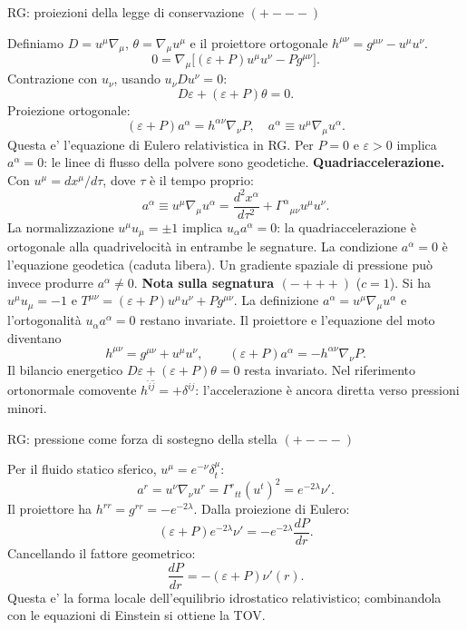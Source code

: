 \begin{frame}[t]{RG: proiezioni della legge di conservazione $(+---)$}\small\raggedright

Definiamo $D=u^\mu\nabla_\mu$, $\theta=\nabla_\mu u^\mu$ e il proiettore ortogonale $h^{\mu\nu}=g^{\mu\nu}-u^\mu u^\nu$.
\[
0=\nabla_\mu\big[(\varepsilon+P)u^\mu u^\nu-Pg^{\mu\nu}\big].
\]
Contrazione con $u_\nu$, usando $u_\nu D u^\nu=0$:
\[
\boxed{D\varepsilon+(\varepsilon+P)\theta=0.}
\]
Proiezione ortogonale:
\[
\boxed{(\varepsilon+P)a^\alpha=h^{\alpha\nu}\nabla_\nu P,\quad
a^\alpha\equiv u^\mu\nabla_\mu u^\alpha.}
\]
Questa e' l'equazione di Eulero relativistica in RG. Per $P=0$ e $\varepsilon>0$ implica $a^\alpha=0$: le linee di flusso della polvere sono geodetiche.
\smallskip
\textbf{Quadriaccelerazione.}
Con $u^\mu=dx^\mu/d\tau$, dove $\tau$ è il tempo proprio:
\[
a^\alpha\equiv u^\mu\nabla_\mu u^\alpha
=\frac{d^2x^\alpha}{d\tau^2}
+\Gamma^\alpha{}_{\mu\nu}u^\mu u^\nu.
\]
La normalizzazione $u^\mu u_\mu=\pm1$ implica
$u_\alpha a^\alpha=0$: la quadriaccelerazione è
ortogonale alla quadrivelocità in entrambe le segnature.
La condizione $a^\alpha=0$ è l'equazione geodetica
(caduta libera). Un gradiente spaziale di pressione
può invece produrre $a^\alpha\ne0$.
\smallskip
\textbf{Nota sulla segnatura $(-+++)$} ($c=1$).
Si ha $u^\mu u_\mu=-1$ e
$T^{\mu\nu}=(\varepsilon+P)u^\mu u^\nu+Pg^{\mu\nu}$.
La definizione $a^\alpha=u^\mu\nabla_\mu u^\alpha$
e l'ortogonalità $u_\alpha a^\alpha=0$ restano invariate.
Il proiettore e l'equazione del moto diventano
\[
h^{\mu\nu}=g^{\mu\nu}+u^\mu u^\nu,
\qquad
(\varepsilon+P)a^\alpha=-h^{\alpha\nu}\nabla_\nu P.
\]
Il bilancio energetico
$D\varepsilon+(\varepsilon+P)\theta=0$ resta invariato.
Nel riferimento ortonormale comovente
$h^{\hat i\hat j}=+\delta^{ij}$: l'accelerazione è ancora
diretta verso pressioni minori.
\end{frame}

\begin{frame}[t]{RG: pressione come forza di sostegno della stella $(+---)$}\small\raggedright

Per il fluido statico sferico, $u^\mu=e^{-\nu}\delta^\mu_t$:
\[
a^r=u^\nu\nabla_\nu u^r=\Gamma^r{}_{tt}(u^t)^2
=e^{-2\lambda}\nu'.
\]
Il proiettore ha $h^{rr}=g^{rr}=-e^{-2\lambda}$. Dalla proiezione di Eulero:
\[
(\varepsilon+P)e^{-2\lambda}\nu'
=-e^{-2\lambda}\frac{dP}{dr}.
\]
Cancellando il fattore geometrico:
\[
\boxed{\frac{dP}{dr}=-(\varepsilon+P)\nu'(r).}
\]
Questa e' la forma locale dell'equilibrio idrostatico relativistico; combinandola con le equazioni di Einstein si ottiene la TOV.

\end{frame}

